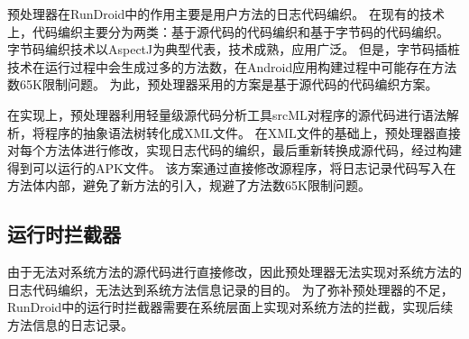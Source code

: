 预处理器在RunDroid中的作用主要是用户方法的日志代码编织。
在现有的技术上，代码编织主要分为两类：基于源代码的代码编织和基于字节码的代码编织。
字节码编织技术以AspectJ\cite{TheAspecJ}为典型代表，技术成熟，应用广泛。
但是，字节码插桩技术在运行过程中会生成过多的方法数，在Android应用构建过程中可能存在方法数65K限制问题。
为此，预处理器采用的方案是基于源代码的代码编织方案。

在实现上，预处理器利用轻量级源代码分析工具srcML\cite{collard2013srcml}对程序的源代码进行语法解析，将程序的抽象语法树转化成XML文件。
在XML文件的基础上，预处理器直接对每个方法体进行修改，实现日志代码的编织，最后重新转换成源代码，经过构建得到可以运行的APK文件。
该方案通过直接修改源程序，将日志记录代码写入在方法体内部，避免了新方法的引入，规避了方法数65K限制问题。


\subsection{运行时拦截器}%

由于无法对系统方法的源代码进行直接修改，因此预处理器无法实现对系统方法的日志代码编织，无法达到系统方法信息记录的目的。
为了弥补预处理器的不足，RunDroid中的运行时拦截器需要在系统层面上实现对系统方法的拦截，实现后续方法信息的日志记录。





